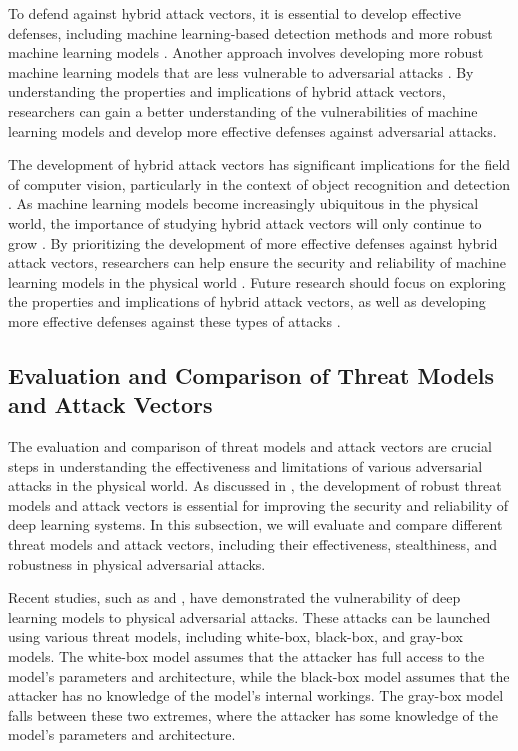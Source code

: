 \documentclass[11pt,a4paper]{article}
\begin{document}
To defend against hybrid attack vectors, it is essential to develop effective defenses, including machine learning-based detection methods and more robust machine learning models \cite{doi:10.1109/tnnls.2021.3105238}. Another approach involves developing more robust machine learning models that are less vulnerable to adversarial attacks \cite{arxiv:1904.13000}. By understanding the properties and implications of hybrid attack vectors, researchers can gain a better understanding of the vulnerabilities of machine learning models and develop more effective defenses against adversarial attacks.

The development of hybrid attack vectors has significant implications for the field of computer vision, particularly in the context of object recognition and detection \cite{doi:10.1007/s10462-024-10841-z}. As machine learning models become increasingly ubiquitous in the physical world, the importance of studying hybrid attack vectors will only continue to grow \cite{doi:10.1109/wacv57701.2024.00393}. By prioritizing the development of more effective defenses against hybrid attack vectors, researchers can help ensure the security and reliability of machine learning models in the physical world \cite{arxiv:2307.15157}. Future research should focus on exploring the properties and implications of hybrid attack vectors, as well as developing more effective defenses against these types of attacks \cite{arxiv:2305.16494}.


\subsection{Evaluation and Comparison of Threat Models and Attack Vectors}


The evaluation and comparison of threat models and attack vectors are crucial steps in understanding the effectiveness and limitations of various adversarial attacks in the physical world. As discussed in \cite{doi:10.1145/3128572.3140444}, the development of robust threat models and attack vectors is essential for improving the security and reliability of deep learning systems. In this subsection, we will evaluate and compare different threat models and attack vectors, including their effectiveness, stealthiness, and robustness in physical adversarial attacks.

Recent studies, such as \cite{arxiv:1707.08945} and \cite{arxiv:1807.07769}, have demonstrated the vulnerability of deep learning models to physical adversarial attacks. These attacks can be launched using various threat models, including white-box, black-box, and gray-box models. The white-box model assumes that the attacker has full access to the model's parameters and architecture, while the black-box model assumes that the attacker has no knowledge of the model's internal workings. The gray-box model falls between these two extremes, where the attacker has some knowledge of the model's parameters and architecture.
\end{document}

